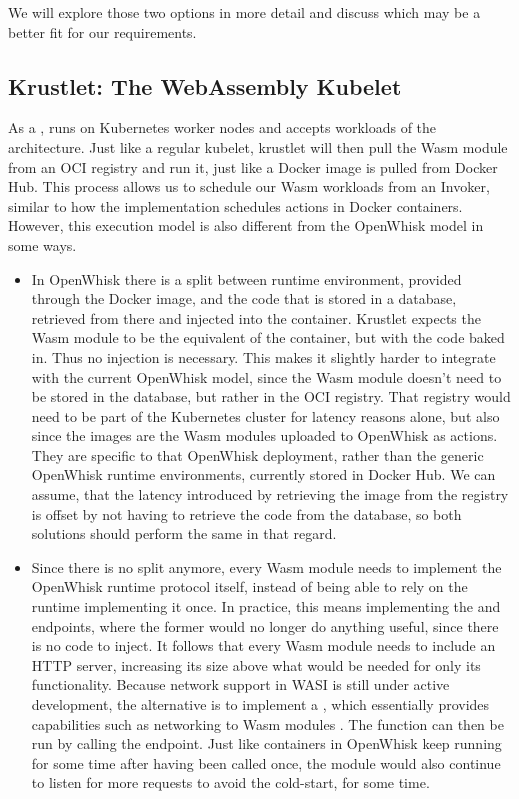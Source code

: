 We will explore those two options in more detail and discuss which may be a better fit for our requirements.

\subsection{Krustlet: The WebAssembly Kubelet}

As a ,  runs on Kubernetes worker nodes and accepts workloads of the  architecture. Just like a regular kubelet, krustlet will then pull the Wasm module from an OCI registry and run it, just like a Docker image is pulled from Docker Hub. This process allows us to schedule our Wasm workloads from an Invoker, similar to how the  implementation schedules actions in Docker containers. However, this execution model is also different from the OpenWhisk model in some ways.

\begin{itemize}
    \item In OpenWhisk there is a split between runtime environment, provided through the Docker image, and the code that is stored in a database, retrieved from there and injected into the container. Krustlet expects the Wasm module to be the equivalent of the container, but with the code baked in. Thus no injection is necessary. This makes it slightly harder to integrate with the current OpenWhisk model, since the Wasm module doesn't need to be stored in the database, but rather in the OCI registry. That registry would need to be part of the Kubernetes cluster for latency reasons alone, but also since the images are the Wasm modules uploaded to OpenWhisk as actions. They are specific to that OpenWhisk deployment, rather than the generic OpenWhisk runtime environments, currently stored in Docker Hub. We can assume, that the latency introduced by retrieving the image from the registry is offset by not having to retrieve the code from the database, so both solutions should perform the same in that regard.
    \item Since there is no split anymore, every Wasm module needs to implement the OpenWhisk runtime protocol itself, instead of being able to rely on the runtime implementing it once. In practice, this means implementing the  and  endpoints, where the former would no longer do anything useful, since there is no code to inject. It follows that every Wasm module needs to include an HTTP server, increasing its size above what would be needed for only its functionality. Because network support in WASI is still under active development, the alternative is to implement a , which essentially provides capabilities such as networking to Wasm modules \cite{WC2021}. The function can then be run by calling the  endpoint. Just like containers in OpenWhisk keep running for some time after having been called once, the module would also continue to listen for more requests to avoid the cold-start, for some time.
\end{itemize}

